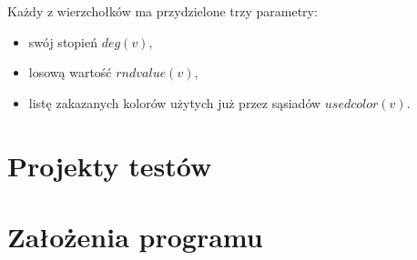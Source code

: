 \documentclass{article}
\begin{document}
	
	Każdy z wierzchołków ma przydzielone trzy parametry:
	\begin{itemize}
		\itemsep0em
		\item swój stopień $deg(v)$,
		\item losową wartość $rndvalue(v)$, 
		\item listę zakazanych kolorów użytych już przez sąsiadów $usedcolor(v)$. 
	\end{itemize} 
	
	\section{Projekty testów}
	\section{Założenia programu}
	
	

 


\end{document}
